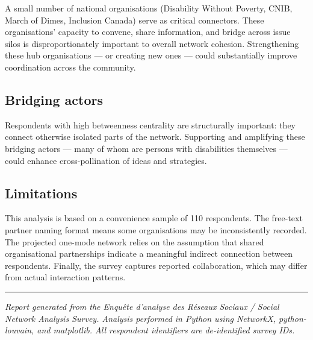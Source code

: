 \documentclass[
  letterpaper,
  DIV=11,
  numbers=noendperiod]{scrartcl}
\begin{document}
A small number of national organisations (Disability Without Poverty,
CNIB, March of Dimes, Inclusion Canada) serve as critical connectors.
These organisations' capacity to convene, share information, and bridge
across issue silos is disproportionately important to overall network
cohesion. Strengthening these hub organisations --- or creating new ones
--- could substantially improve coordination across the community.

\subsection{Bridging actors}\label{bridging-actors}

Respondents with high betweenness centrality are structurally important:
they connect otherwise isolated parts of the network. Supporting and
amplifying these bridging actors --- many of whom are persons with
disabilities themselves --- could enhance cross-pollination of ideas and
strategies.

\subsection{Limitations}\label{limitations}

This analysis is based on a convenience sample of 110 respondents. The
free-text partner naming format means some organisations may be
inconsistently recorded. The projected one-mode network relies on the
assumption that shared organisational partnerships indicate a meaningful
indirect connection between respondents. Finally, the survey captures
reported collaboration, which may differ from actual interaction
patterns.

\begin{center}\rule{0.5\linewidth}{0.5pt}\end{center}

\emph{Report generated from the Enquête d'analyse des Réseaux Sociaux /
Social Network Analysis Survey. Analysis performed in Python using
NetworkX, python-louvain, and matplotlib. All respondent identifiers are
de-identified survey IDs.}
\end{document}
